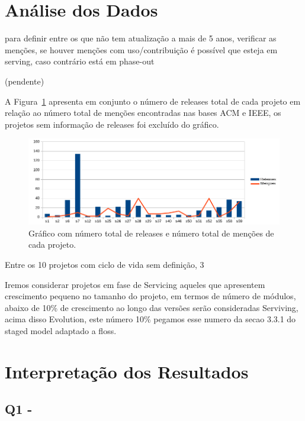 \section{Análise dos Dados} \label{estudo3:analise}

para definir entre os que não tem atualização a mais de 5 anos, verificar as
menções, se houver menções com uso/contribuição é possível que esteja em serving,
caso contrário está em phase-out

(pendente)

A Figura~\ref{releases-vs-mentions} apresenta em conjunto o número de releases total
de cada projeto em relação ao número total de menções encontradas nas bases ACM e IEEE,
os projetos sem informação de releases foi excluído do gráfico.

\begin{figure}[h]
  \centering
 \includegraphics[scale=0.6]{imagens/releases-vs-mentions.png}
  \caption{Gráfico com número total de releases e número total de menções de cada projeto.}
  \label{releases-vs-mentions}
\end{figure}


Entre os 10 projetos com ciclo de vida sem definição, 3

Iremos considerar projetos em fase de Servicing aqueles que apresentem crescimento
pequeno no tamanho do projeto, em termos de número de módulos, abaixo de 10\% de crescimento
ao longo das versões serão consideradas Serviving, acima disso Evolution, este número 10\%
pegamos esse numero da secao 3.3.1 do staged model adaptado a floss.

\section{Interpretação dos Resultados} \label{estudo3:interpretacao}

\subsection{Q1 - \EstudoDoisQuestaoUm}

